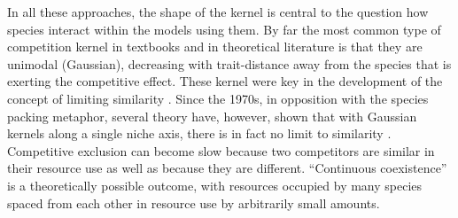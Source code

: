 \documentclass[a4paper,11pt]{article}
\begin{document}
In all these approaches, the shape of the kernel is central to the question how
species interact within the models using them.
By far the most common type of competition kernel in textbooks and in
theoretical literature is that they are unimodal (Gaussian),
decreasing with trait-distance away from the species that is exerting
the competitive effect. These kernel were key in the development of
the concept of limiting similarity \citep{MacArthur-1967}. Since the
1970s, in
opposition with the species packing metaphor, several theory have, however,
shown that
with Gaussian kernels along a single niche axis, there is in fact no
limit to similarity \citep{May-1972, Abrams-1975,
  Abrams-1983}. Competitive exclusion can become slow because two
competitors are similar in their resource use as well as because they
are different. ``Continuous coexistence'' is a theoretically possible
outcome, with resources occupied by many species spaced from each
other in resource use by arbitrarily small amounts.
\end{document}

